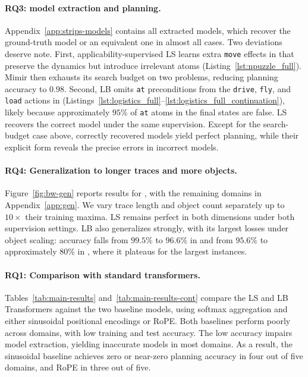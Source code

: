 \paragraph{RQ3: \strips model extraction and planning.}
Appendix~\ref{app:strips-models} contains all extracted models, which recover the ground-truth model or an equivalent one in almost all cases.
Two deviations deserve note.
First, applicability-supervised LS learns extra \texttt{move} effects in \np that preserve the dynamics but introduce irrelevant atoms
(Listing~\ref{lst:npuzzle_full}).
Mimir then exhausts its search budget on two problems, reducing planning accuracy to $0.98$.
Second, LB omits \texttt{at} preconditions from the \texttt{drive}, \texttt{fly}, and \texttt{load} actions in \lgt
(Listings~\ref{lst:logistics_full}--\ref{lst:logistics_full_continuation}), likely because approximately $95\%$ of \texttt{at} atoms in the final states are false.
LS recovers the correct \lgt model under the same supervision.
Except for the search-budget case above, correctly recovered models yield perfect planning, while their explicit form reveals the precise errors in incorrect models.

\paragraph{RQ4: Generalization to longer traces and more objects.}
Figure~\ref{fig:bw-gen} reports results for \bw, with the remaining domains in Appendix~\ref{app:gen}.
We vary trace length and object count separately up to $10\times$ their training maxima.
LS remains perfect in both dimensions under both supervision settings.
LB also generalizes strongly, with its largest losses under object scaling: accuracy falls from $99.5\%$ to $96.6\%$ in \bw and from $95.6\%$ to approximately $80\%$ in \lgt, where it plateaus for the largest instances.



\iffalse
    \paragraph{RQ1: Comparison with standard transformers.}
    Tables~\ref{tab:main-results} and~\ref{tab:main-results-cont} compare the LS and LB Transformers against the two baseline models, using softmax aggregation and either sinusoidal positional encodings or RoPE.
    Both baselines perform poorly across domains, with low training and test accuracy.
    The low accuracy impairs model extraction, yielding inaccurate \strips models in most domains. As a result, the sinusoidal baseline achieves zero or near-zero planning accuracy in four out of five domains, and RoPE in three out of five.
    
